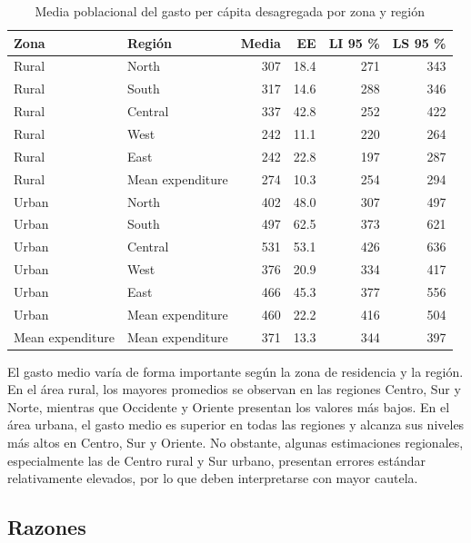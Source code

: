 \documentclass[
  spanish,
  11pt,
  letterpaper,
  oneside,
  open=any]{scrbook}
\begin{document}
{

\begin{longtable}[]{@{}llrrrr@{}}

\caption{\label{tbl-media-gasto-zona-reg}Media poblacional del gasto per
cápita desagregada por zona y región}

\tabularnewline

\toprule\noalign{}
Zona & Región & Media & EE & LI 95 \% & LS 95 \% \\
\midrule\noalign{}
\endhead
\bottomrule\noalign{}
\endlastfoot
Rural & North & 307 & 18.4 & 271 & 343 \\
Rural & South & 317 & 14.6 & 288 & 346 \\
Rural & Central & 337 & 42.8 & 252 & 422 \\
Rural & West & 242 & 11.1 & 220 & 264 \\
Rural & East & 242 & 22.8 & 197 & 287 \\
Rural & Mean expenditure & 274 & 10.3 & 254 & 294 \\
Urban & North & 402 & 48.0 & 307 & 497 \\
Urban & South & 497 & 62.5 & 373 & 621 \\
Urban & Central & 531 & 53.1 & 426 & 636 \\
Urban & West & 376 & 20.9 & 334 & 417 \\
Urban & East & 466 & 45.3 & 377 & 556 \\
Urban & Mean expenditure & 460 & 22.2 & 416 & 504 \\
Mean expenditure & Mean expenditure & 371 & 13.3 & 344 & 397 \\

\end{longtable}

}

El gasto medio varía de forma importante según la zona de residencia y
la región. En el área rural, los mayores promedios se observan en las
regiones Centro, Sur y Norte, mientras que Occidente y Oriente presentan
los valores más bajos. En el área urbana, el gasto medio es superior en
todas las regiones y alcanza sus niveles más altos en Centro, Sur y
Oriente. No obstante, algunas estimaciones regionales, especialmente las
de Centro rural y Sur urbano, presentan errores estándar relativamente
elevados, por lo que deben interpretarse con mayor cautela.

\subsection{Razones}\label{estimacion-de-razones}
\end{document}
